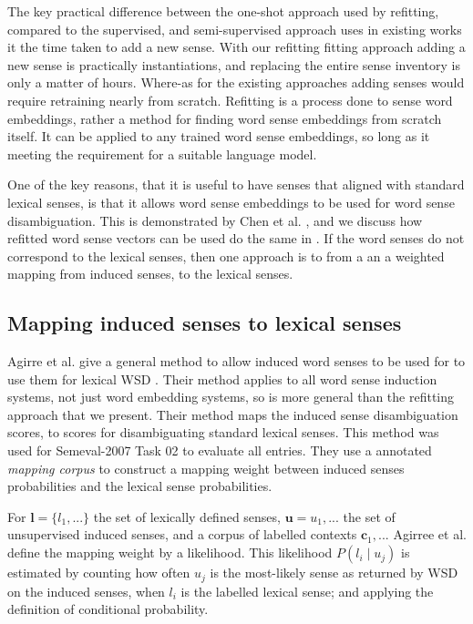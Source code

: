 \documentclass{sig-alternate}
\renewcommand{\c}{\mathbf{c}}
\renewcommand{\l}{\mathbf{l}}
\renewcommand{\u}{\mathbf{u}}
\begin{document}
The key practical difference between the one-shot approach used by refitting, compared to the supervised, and semi-supervised approach uses in existing works it the time taken to  add a new sense. With our refitting fitting approach adding a new sense is practically instantiations, and replacing the entire sense inventory is only a matter of hours. Where-as for the existing approaches adding senses would require retraining nearly from scratch. Refitting is a process done to sense word embeddings, rather a method for finding word sense embeddings from scratch itself. It can be applied to any trained word sense embeddings, so long as it meeting the requirement for a suitable language model.

One of the key reasons, that it is useful to have senses that aligned with standard lexical senses, is that it allows word sense embeddings to be used for word sense disambiguation. This is demonstrated by Chen et al.  \parencite{Chen2014}, and we discuss how refitted word sense vectors can be used do the same in . If the word senses do not correspond to the lexical senses, then one approach is to from a an a weighted mapping from induced senses, to the lexical senses.

\subsection{Mapping induced senses to lexical senses}
 Agirre et al. give a general method to allow induced word senses to be used for to use them for lexical WSD \parencite{agirre2006}.
Their method applies to all word sense induction systems, not just word embedding systems, so is more general than the refitting approach that we present.
Their method maps the induced sense disambiguation scores, to scores for disambiguating standard lexical senses. This method was used for Semeval-2007 Task 02 \parencite{SemEval2007WSIandWSD} to evaluate all entries.
They use a annotated \emph{mapping corpus} to construct a mapping weight between induced senses probabilities and the lexical sense probabilities.

For $\l=\{l_1,...\}$ the set of lexically defined senses, $\u={u_1,...}$ the set of unsupervised induced senses, and a corpus of labelled contexts ${\c_1, ...}$ Agirree et al. define the mapping weight by a likelihood.
This likelihood $P(l_i \mid u_j)$ is estimated by counting how often $u_j$ is the most-likely sense as returned by WSD on the induced senses, when $l_i$ is the labelled lexical sense; and applying the definition of conditional probability.
\end{document}
